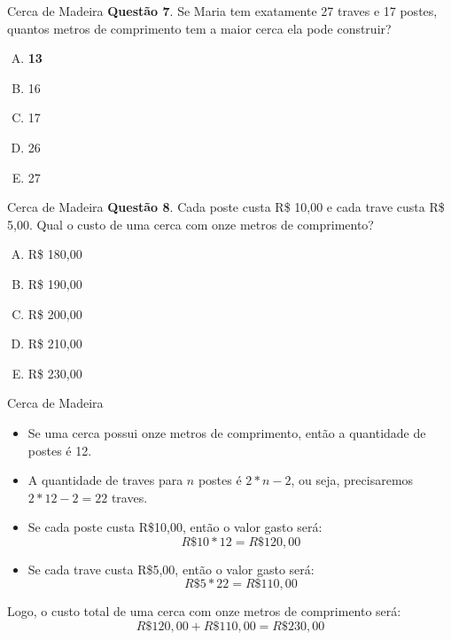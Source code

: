 \documentclass{beamer}
\begin{document}
\begin{frame}{Cerca de Madeira}
\textbf{Questão 7}. Se Maria tem exatamente 27 traves
e 17 postes, quantos metros de comprimento tem
a maior cerca ela pode construir?

\begin{enumerate}[(A)]
    \item \textbf{13}
    \item 16
    \item 17
    \item 26
    \item 27
\end{enumerate}

\end{frame}

\begin{frame}{Cerca de Madeira}
\textbf{Questão 8}. Cada poste custa R\$ 10,00 e cada trave custa R\$ 5,00. Qual o custo de uma cerca com onze metros de comprimento?


\begin{enumerate}[(A)]
    \item R\$ 180,00
    \item R\$ 190,00
    \item R\$ 200,00
    \item R\$ 210,00
    \item R\$ 230,00
\end{enumerate}

\end{frame}
\begin{frame}{Cerca de Madeira}
\begin{itemize}
    \item Se uma cerca possui onze metros de comprimento, então a quantidade de postes é 12.
    \pause 
    \item A quantidade de traves para $n$ postes é $2*n-2$, ou seja, precisaremos  $2 \ast 12 - 2  = 22$ traves.

    \item Se cada poste custa R\$10,00, então o valor gasto será:
\begin{equation*}
   R\$10\ast 12 = R\$120,00
\end{equation*}
\pause
    \item Se cada trave custa R\$5,00, então o valor gasto será:
\begin{equation*}
    R\$5\ast 22 = R\$110,00
\end{equation*}
\end{itemize}
\pause
Logo, o custo total de uma cerca com onze metros de comprimento será:
\begin{equation*}
    R\$120,00 + R\$110,00 = R\$230,00
\end{equation*}

\end{frame}
\end{document}
